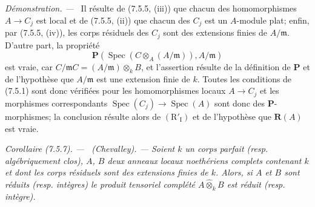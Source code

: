 \documentclass[10pt,oneside]{book}
\newenvironment{corollary}[1][]{%
  \par\medskip\noindent\itshape Corollaire (#1). ---\ }{\par}
\newenvironment{proof}{%
  \par\medskip\noindent\textit{Démonstration. ---\ }}{\par}
\begin{document}
\begin{proof}
Il résulte de (7.5.5, (iii)) que chacun des homomorphismes $A\to C_j$ est local
et de (7.5.5, (ii)) que chacun des $C_j$ est un $A$-module plat; enfin, par
(7.5.5, (iv)), les corps résiduels des $C_j$ sont des extensions finies de
$A/\mathfrak m$. D'autre part, la propriété
\[
\boldsymbol P(\operatorname{Spec}(C\otimes_A(A/\mathfrak m)),A/\mathfrak m)
\]
est vraie, car $C/\mathfrak mC=(A/\mathfrak m)\otimes_kB$, et l'assertion
résulte de la définition de $\boldsymbol P$ et de l'hypothèse que
$A/\mathfrak m$ est une extension finie de $k$. Toutes les conditions de
(7.5.1) sont donc vérifiées pour les homomorphismes locaux $A\to C_j$ et les
morphismes correspondants
$\operatorname{Spec}(C_j)\to\operatorname{Spec}(A)$ sont donc des
$\boldsymbol P$-morphismes; la conclusion résulte alors de
$(\mathrm R'_{\mathrm I})$ et de l'hypothèse que $\boldsymbol R(A)$ est vraie.
\end{proof}

\begin{corollary}[7.5.7]
\label{IV.2.s7.5.7-fr}
(Chevalley). --- Soient $k$ un corps parfait (resp. algébriquement clos), $A$,
$B$ deux anneaux locaux noethériens complets contenant $k$ et dont les corps
résiduels sont des extensions finies de $k$. Alors, si $A$ et $B$ sont réduits
(resp. intègres) le produit tensoriel complété $A\widehat\otimes_k B$ est
réduit (resp. intègre).
\end{corollary}
\end{document}
